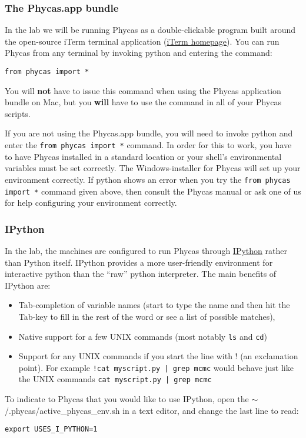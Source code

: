 \documentclass{article}
\newcommand{\cmd}[1]{\texttt{#1}\xspace}
\newcommand{\phycas}{Phycas\xspace}
\newcommand{\localfile}[1]{\textsf{#1}\xspace}
\begin{document}
\subsubsection{The Phycas.app bundle}
In the lab we will be running \phycas as a double-clickable program built around the open-source iTerm terminal application (\href{http://iterm.sourceforge.net/}{iTerm homepage}).
You can run \phycas from any terminal by invoking python and entering the command:
\begin{verbatim}
from phycas import *
\end{verbatim}
You will {\bf not} have to issue this command when using the \phycas application bundle on Mac, but you {\bf will} have to use the command in all of your \phycas scripts.

If you are not using the Phycas.app bundle, you will need to invoke python and enter the \cmd{from phycas import *} command.
In order for this to work, you have to have \phycas installed in a standard location or your shell's environmental variables must be set correctly.
The Windows-installer for \phycas will set up your environment correctly.
If python shows an error when you try the \cmd{from phycas import *}  command given above, then consult the \phycas manual or ask one
of us for help configuring your environment correctly.

\subsubsection{IPython}
In the lab, the machines are configured to run \phycas through \href{http://ipython.scipy.org/moin/}{IPython} rather than Python itself.  
IPython provides a more user-friendly environment for interactive python than the ``raw'' python interpreter.
The main benefits of IPython are:
\begin{itemize}
	\item Tab-completion of variable names (start to type the name and then hit the Tab-key to fill in the rest of the word or see a list of possible matches),
	\item Native support for a few UNIX commands (most notably \cmd{ls} and \cmd{cd})
	\item Support for any UNIX commands if you start the line with ! (an exclamation point). For example \cmd{!cat myscript.py | grep mcmc} would behave just like the UNIX commands \cmd{cat myscript.py | grep mcmc}
\end{itemize}
To indicate to \phycas that you would like to use IPython, open the \localfile{$\sim$/.phycas/active\_phycas\_env.sh} 
in a text editor, and change the last line to read:
\begin{verbatim}
export USES_I_PYTHON=1
\end{verbatim}
 
\end{document}
